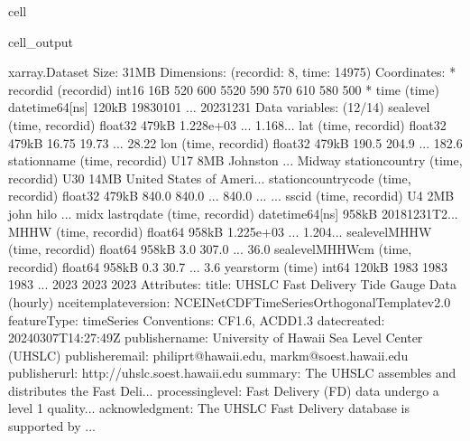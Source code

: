 \documentclass[letterpaper,10pt,english]{jupyterBook}
\begin{document}
\begin{sphinxuseclass}{cell}
\begin{sphinxVerbatimOutput}
\begin{sphinxuseclass}{cell_output}
\begin{sphinxVerbatim}[commandchars=\\\{\}]
\PYGZlt{}xarray.Dataset\PYGZgt{} Size: 31MB
Dimensions:               (record\PYGZus{}id: 8, time: 14975)
Coordinates:
  * record\PYGZus{}id             (record\PYGZus{}id) int16 16B 520 600 5520 590 570 610 580 500
  * time                  (time) datetime64[ns] 120kB 1983\PYGZhy{}01\PYGZhy{}01 ... 2023\PYGZhy{}12\PYGZhy{}31
Data variables: (12/14)
    sea\PYGZus{}level             (time, record\PYGZus{}id) float32 479kB 1.228e+03 ... 1.168...
    lat                   (time, record\PYGZus{}id) float32 479kB 16.75 19.73 ... 28.22
    lon                   (time, record\PYGZus{}id) float32 479kB 190.5 204.9 ... 182.6
    station\PYGZus{}name          (time, record\PYGZus{}id) \PYGZlt{}U17 8MB \PYGZsq{}Johnston\PYGZsq{} ... \PYGZsq{}Midway\PYGZsq{}
    station\PYGZus{}country       (time, record\PYGZus{}id) \PYGZlt{}U30 14MB \PYGZsq{}United States of Ameri...
    station\PYGZus{}country\PYGZus{}code  (time, record\PYGZus{}id) float32 479kB 840.0 840.0 ... 840.0
    ...                    ...
    ssc\PYGZus{}id                (time, record\PYGZus{}id) \PYGZlt{}U4 2MB \PYGZsq{}john\PYGZsq{} \PYGZsq{}hilo\PYGZsq{} ... \PYGZsq{}midx\PYGZsq{}
    last\PYGZus{}rq\PYGZus{}date          (time, record\PYGZus{}id) datetime64[ns] 958kB 2018\PYGZhy{}12\PYGZhy{}31T2...
    MHHW                  (time, record\PYGZus{}id) float64 958kB 1.225e+03 ... 1.204...
    sea\PYGZus{}level\PYGZus{}MHHW        (time, record\PYGZus{}id) float64 958kB 3.0 307.0 ... \PYGZhy{}36.0
    sea\PYGZus{}level\PYGZus{}MHHW\PYGZus{}cm     (time, record\PYGZus{}id) float64 958kB 0.3 30.7 ... \PYGZhy{}3.6
    year\PYGZus{}storm            (time) int64 120kB 1983 1983 1983 ... 2023 2023 2023
Attributes:
    title:                  UHSLC Fast Delivery Tide Gauge Data (hourly)
    ncei\PYGZus{}template\PYGZus{}version:  NCEI\PYGZus{}NetCDF\PYGZus{}TimeSeries\PYGZus{}Orthogonal\PYGZus{}Template\PYGZus{}v2.0
    featureType:            timeSeries
    Conventions:            CF\PYGZhy{}1.6, ACDD\PYGZhy{}1.3
    date\PYGZus{}created:           2024\PYGZhy{}03\PYGZhy{}07T14:27:49Z
    publisher\PYGZus{}name:         University of Hawaii Sea Level Center (UHSLC)
    publisher\PYGZus{}email:        philiprt@hawaii.edu, markm@soest.hawaii.edu
    publisher\PYGZus{}url:          http://uhslc.soest.hawaii.edu
    summary:                The UHSLC assembles and distributes the Fast Deli...
    processing\PYGZus{}level:       Fast Delivery (FD) data undergo a level 1 quality...
    acknowledgment:         The UHSLC Fast Delivery database is supported by ...
\end{sphinxVerbatim}

\end{sphinxuseclass}\end{sphinxVerbatimOutput}

\end{sphinxuseclass}
\end{document}
